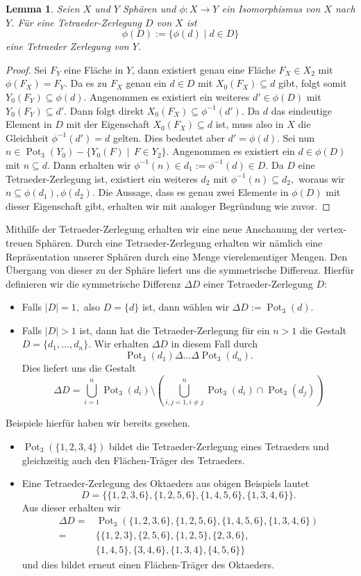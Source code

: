 \documentclass[12pt,titlepage,twoside,cleardoublepage]{article}
\theoremstyle{nummermitklammern}
\newtheorem{lemma}[temp]{Lemma}
\newtheorem{lemma}[zahl]{Lemma}
\numberwithin{equation}{section}
\DeclareMathOperator{\Pot}{Pot}
\begin{document}
\begin{lemma}
Seien $X$ und $Y$ Sphären und $\phi:X\to Y$ ein Isomorphismus von $X$ nach $Y$. Für eine Tetraeder-Zerlegung $D$ von $X$ ist \[
\phi(D):=\{\phi(d)\mid d\in D\}
\] eine Tetraeder Zerlegung von $Y$.
\end{lemma}
\begin{proof}
Sei $F_Y$ eine Fläche in $Y$, dann existiert genau eine Fläche $F_X\in X_2$ mit $\phi(F_X)=F_Y.$
 Da es zu $F_X$ genau ein $d\in D$ mit $X_0(F_X) \subseteq d$ gibt, folgt somit $Y_0(F_Y)\subseteq \phi(d).$
  Angenommen es existiert ein weiteres $d'\in \phi(D)$ mit $Y_0(F_Y)\subseteq d'$. Dann folgt direkt $X_0(F_X)\subseteq\phi^{-1}(d').$
   Da $d$ das eindeutige Element in $D$ mit der Eigenschaft $X_0(F_X)\subseteq d$ ist, muss also in $X$ die Gleichheit $\phi^{-1}(d')=d$ gelten. Dies bedeutet aber $d'=\phi(d).$ Sei nun $n\in \Pot_3(Y_0)-\{Y_0(F)\mid \,F \in Y_2\}.$ Angenommen es existiert ein $d\in \phi(D)$ mit $n\subseteq d.$ Dann erhalten wir $\phi^{-1}(n)\in d_1:=\phi^{-1}(d)\in D.$ Da  $D$ eine Tetraeder-Zerlegung ist, existiert ein weiteres $d_2$ mit $\phi^{-1}(n)\subseteq d_2,$ woraus wir $n\subseteq \phi(d_1),\phi(d_2).$ Die Aussage, dass es genau zwei Elemente in $\phi(D)$ mit dieser Eigenschaft gibt, erhalten wir mit analoger Begründung wie zuvor.  
\end{proof}
Mithilfe der Tetraeder-Zerlegung erhalten wir eine neue Anschauung der vertex-treuen Sphären. Durch eine Tetraeder-Zerlegung erhalten wir nämlich eine Repräsentation unserer Sphären durch eine Menge vierelementiger Mengen. Den Übergang von dieser zu der Sphäre liefert uns die symmetrische Differenz. Hierfür definieren wir die symmetrische Differenz $\Delta D$ einer Tetraeder-Zerlegung $D:$
\begin{itemize}
\item Falls $\vert D\vert =1,$ also $D=\{d\}$ ist, dann wählen wir $\Delta D:=\Pot_3(d).$
\item Falls $\vert D\vert >1$ ist, dann hat die Tetraeder-Zerlegung für ein $n>1$ die Gestalt $D=\{d_1,\ldots,d_n\}.$
Wir  erhalten $\Delta D$ in diesem Fall durch
\[
\Pot_3(d_1)\Delta \ldots \Delta \Pot_3(d_n).
\]
Dies liefert uns die Gestalt 
\[
\Delta D=\bigcup^n_{i=1} \Pot_3(d_i)\setminus  (\bigcup^n_{i,j=1,i\neq j}\Pot_3(d_i)\cap \Pot_3(d_j))
\]
\end{itemize} 
Beispiele hierfür haben wir bereits gesehen.
\begin{itemize}
\item $\Pot_3(\{1,2,3,4\})$ bildet die Tetraeder-Zerlegung eines Tetraeders und gleichzeitig auch den Flächen-Träger des Tetraeders.
\item Eine Tetraeder-Zerlegung des Oktaeders aus obigen Beispiels lautet
 \[
D=\{\{1,2,3,6\},\{1,2,5,6\},\{1,4,5,6\},\{1,3,4,6\}\}. 
 \]
 Aus dieser erhalten wir 
 \begin{align*}
\Delta D=&\Pot_3(\{1,2,3,6\},\{1,2,5,6\},\{1,4,5,6\},\{1,3,4,6\})\\
=&\{\{1,2,3\},\{2,5,6\},\{1,2,5\},\{2,3,6\},\\
&\{1,4,5\},\{3,4,6\},\{1,3,4\},\{4,5,6\}\}
\end{align*}
und dies bildet erneut einen Flächen-Träger des Oktaeders.
\end{itemize} 
\end{document}
